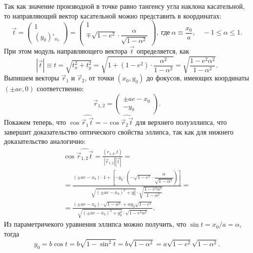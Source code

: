 Так как значение производной в точке равно тангенсу угла наклона касательной, то направляющий вектор касательной можно представить в координатах:
\begin{equation*}
    \vec t =
    \begin{pmatrix}
        1\\
        (y_0)'_{x_0}
    \end{pmatrix}
    =
    \begin{pmatrix}
        1\\
        \mp \sqrt{1 - e^2} \cdot \dfrac{\alpha}{\sqrt{1 - \alpha^2}}
    \end{pmatrix},~\text{где}~ \alpha \equiv \frac{x_0}{a},\quad -1 \leqslant \alpha \leqslant 1.
\end{equation*}
При этом модуль направляющего вектора $\vec t$ определяется, как
\begin{equation*}
    |\vec t| \equiv t = \sqrt{t_x^2 + t_y^2} = \sqrt{1 + (1 - e^2) \cdot \frac{\alpha^2}{1 - \alpha^2}} = \sqrt{\frac{1 - e^2 \alpha^2}{1 - \alpha^2}}.
\end{equation*}
Выпишем векторы $\vec r_1$ и $\vec r_2$, от точки $(x_0, y_0)$ до фокусов, имеющих координаты $(\pm ae, 0)$ соответственно:
\begin{equation*}
    \vec r_{1,2} =
    \begin{pmatrix}
        \pm ae - x_0\\
        -y_0
    \end{pmatrix}.
\end{equation*}
Покажем теперь, что $\cos \widehat{\vec r_1 \vec t} = - \cos \widehat{\vec r_2 \vec t}$ для верхнего полуэллипса, что завершит доказательство оптического свойства эллипса, так как для нижнего доказательство аналогично:
\begin{multline*}
    \cos \widehat{\vec r_{1, 2}  \vec t}
    = \frac{(r_{1, 2}, t)}{|\vec r_{1, 2}| | \vec t|} = \\
    = \frac{(\pm ae - x_0) \cdot 1 + \left[ -y_0 \cdot \left(- \sqrt{1 - e^2} \cdot \dfrac{\alpha}{\sqrt{1 - \alpha^2}} \right) \right]}{\sqrt{(\pm ae - x_0)^2 + y_0^2} \cdot \sqrt{\dfrac{1 - e^2 \alpha^2}{1 - \alpha^2}}} =\\
    = \frac{(\pm ae - x_0) \cdot \sqrt{1 - \alpha^2} + \alpha y_0\sqrt{1 - e^2}}{\sqrt{(\pm ae - x_0)^2 + y_0^2} \cdot \sqrt{1 - e^2 \alpha^2}}.
\end{multline*}
Из параметричекого уравнения эллипса можно получить, что $\sin t = x_0/a = \alpha$, тогда
\begin{equation*}
    y_0 = b \cos t = b \sqrt{1 - \sin^2 t} = b \sqrt{1 - \alpha^2} = a \sqrt{1 - e^2} \sqrt{1 - \alpha^2}.
\end{equation*}
